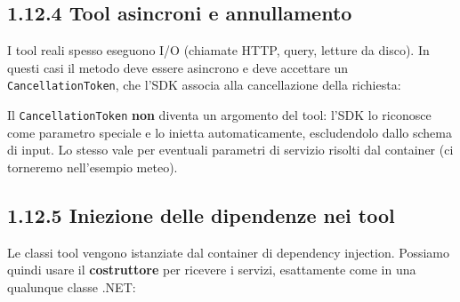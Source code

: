 \documentclass[
  italian,
  10pt,
]{book}
\newenvironment{Shaded}{\begin{snugshade}}{\end{snugshade}}
\newcommand{\DataTypeTok}[1]{\textcolor[rgb]{0.13,0.29,0.53}{#1}}
\newcommand{\FunctionTok}[1]{\textcolor[rgb]{0.13,0.29,0.53}{\textbf{#1}}}
\newcommand{\KeywordTok}[1]{\textcolor[rgb]{0.13,0.29,0.53}{\textbf{#1}}}
\newcommand{\NormalTok}[1]{#1}
\newcommand{\OperatorTok}[1]{\textcolor[rgb]{0.81,0.36,0.00}{\textbf{#1}}}
\newcommand{\StringTok}[1]{\textcolor[rgb]{0.31,0.60,0.02}{#1}}
\begin{document}
\subsection{1.12.4 Tool asincroni e
annullamento}\label{tool-asincroni-e-annullamento}

I tool reali spesso eseguono I/O (chiamate HTTP, query, letture da
disco). In questi casi il metodo deve essere asincrono e deve accettare
un \texttt{CancellationToken}, che l'SDK associa alla cancellazione
della richiesta:

\begin{Shaded}
\end{Shaded}

Il \texttt{CancellationToken} \textbf{non} diventa un argomento del
tool: l'SDK lo riconosce come parametro speciale e lo inietta
automaticamente, escludendolo dallo schema di input. Lo stesso vale per
eventuali parametri di servizio risolti dal container (ci torneremo
nell'esempio meteo).

\subsection{1.12.5 Iniezione delle dipendenze nei
tool}\label{iniezione-delle-dipendenze-nei-tool}

Le classi tool vengono istanziate dal container di dependency injection.
Possiamo quindi usare il \textbf{costruttore} per ricevere i servizi,
esattamente come in una qualunque classe .NET:
\end{document}
